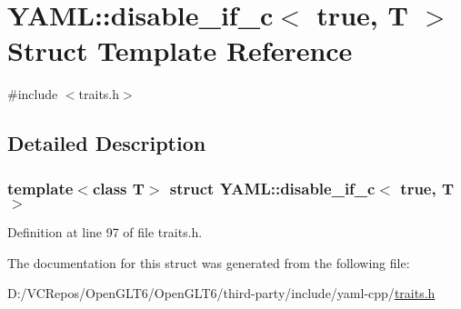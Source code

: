 \hypertarget{struct_y_a_m_l_1_1disable__if__c_3_01true_00_01_t_01_4}{}\section{Y\+A\+ML\+::disable\+\_\+if\+\_\+c$<$ true, T $>$ Struct Template Reference}
\label{struct_y_a_m_l_1_1disable__if__c_3_01true_00_01_t_01_4}


{\ttfamily \#include $<$traits.\+h$>$}



\subsection{Detailed Description}
\subsubsection*{template$<$class T$>$\newline
struct Y\+A\+M\+L\+::disable\+\_\+if\+\_\+c$<$ true, T $>$}



Definition at line 97 of file traits.\+h.



The documentation for this struct was generated from the following file\+:\begin{DoxyCompactItemize}
\item 
D\+:/\+V\+C\+Repos/\+Open\+G\+L\+T6/\+Open\+G\+L\+T6/third-\/party/include/yaml-\/cpp/\mbox{\hyperlink{traits_8h}{traits.\+h}}\end{DoxyCompactItemize}
